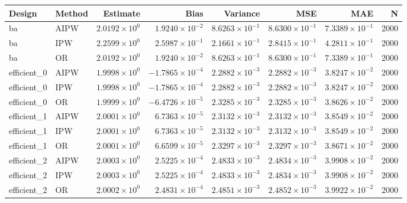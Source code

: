 \begin{table}[ht]
\centering
\begin{tabular}{llrrrrrr}
  \toprule
Design & Method & Estimate & Bias & Variance & MSE & MAE & N \\ 
  \midrule
ba & AIPW & $2.0192 \times 10^{0}$ & $1.9240 \times 10^{-2}$ & $8.6263 \times 10^{-1}$ & $8.6300 \times 10^{-1}$ & $7.3389 \times 10^{-1}$ & 2000 \\ 
  ba & IPW & $2.2599 \times 10^{0}$ & $2.5987 \times 10^{-1}$ & $2.1661 \times 10^{-1}$ & $2.8415 \times 10^{-1}$ & $4.2811 \times 10^{-1}$ & 2000 \\ 
  ba & OR & $2.0192 \times 10^{0}$ & $1.9240 \times 10^{-2}$ & $8.6263 \times 10^{-1}$ & $8.6300 \times 10^{-1}$ & $7.3389 \times 10^{-1}$ & 2000 \\ 
   \midrule
efficient\_0 & AIPW & $1.9998 \times 10^{0}$ & $-1.7865 \times 10^{-4}$ & $2.2882 \times 10^{-3}$ & $2.2882 \times 10^{-3}$ & $3.8247 \times 10^{-2}$ & 2000 \\ 
  efficient\_0 & IPW & $1.9998 \times 10^{0}$ & $-1.7865 \times 10^{-4}$ & $2.2882 \times 10^{-3}$ & $2.2882 \times 10^{-3}$ & $3.8247 \times 10^{-2}$ & 2000 \\ 
  efficient\_0 & OR & $1.9999 \times 10^{0}$ & $-6.4726 \times 10^{-5}$ & $2.3285 \times 10^{-3}$ & $2.3285 \times 10^{-3}$ & $3.8626 \times 10^{-2}$ & 2000 \\ 
   \midrule
efficient\_1 & AIPW & $2.0001 \times 10^{0}$ & $6.7363 \times 10^{-5}$ & $2.3132 \times 10^{-3}$ & $2.3132 \times 10^{-3}$ & $3.8549 \times 10^{-2}$ & 2000 \\ 
  efficient\_1 & IPW & $2.0001 \times 10^{0}$ & $6.7363 \times 10^{-5}$ & $2.3132 \times 10^{-3}$ & $2.3132 \times 10^{-3}$ & $3.8549 \times 10^{-2}$ & 2000 \\ 
  efficient\_1 & OR & $2.0001 \times 10^{0}$ & $6.6599 \times 10^{-5}$ & $2.3297 \times 10^{-3}$ & $2.3297 \times 10^{-3}$ & $3.8671 \times 10^{-2}$ & 2000 \\ 
   \midrule
efficient\_2 & AIPW & $2.0003 \times 10^{0}$ & $2.5225 \times 10^{-4}$ & $2.4833 \times 10^{-3}$ & $2.4834 \times 10^{-3}$ & $3.9908 \times 10^{-2}$ & 2000 \\ 
  efficient\_2 & IPW & $2.0003 \times 10^{0}$ & $2.5225 \times 10^{-4}$ & $2.4833 \times 10^{-3}$ & $2.4834 \times 10^{-3}$ & $3.9908 \times 10^{-2}$ & 2000 \\ 
  efficient\_2 & OR & $2.0002 \times 10^{0}$ & $2.4831 \times 10^{-4}$ & $2.4851 \times 10^{-3}$ & $2.4852 \times 10^{-3}$ & $3.9922 \times 10^{-2}$ & 2000 \\ 

\end{tabular}
\end{table}
